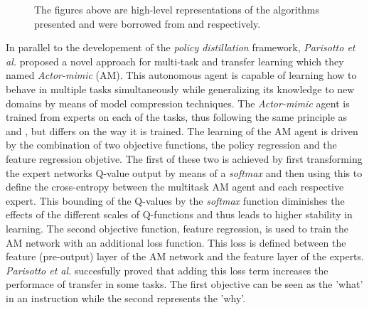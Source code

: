 \documentclass{article}
\begin{document}
\begin{figure}[!ht]
     \hfill
     \caption{The figures above are high-level representations of the algorithms presented and were borrowed from \citep{Teh2017Distral:Learning} and \citep{YinKnowledgeReplay} respectively.}
     \label{fig:high -level}
\end{figure}
\newline
In parallel to the developement of the \textit{policy distillation} framework, \textit{Parisotto et al.} \citep{Parisotto2015Actor-Mimic:Learning} proposed a novel approach for multi-task and transfer learning which they named \textit{Actor-mimic} (AM). This autonomous agent is capable of learning how to behave in multiple tasks simultaneously while generalizing its knowledge to new domains by means of model compression techniques. The \textit{Actor-mimic} agent is trained from experts on each of the tasks, thus following the same principle as \citep{RusuPOLICYDISTILLATION} and \citep{Teh2017Distral:Learning}, but differs on the way it is trained. 
The learning of the AM agent is driven by the combination of two objective functions, the policy regression and the feature regression objetive. The first of these two is achieved by first transforming the expert networks Q-value output by means of a \textit{softmax} and then using this to define the cross-entropy between the multitask AM agent and each respective expert. This bounding of the Q-values by the \textit{softmax} function diminishes the effects of the different scales of Q-functions and thus leads to higher stability in learning. The second objective function, feature regression, is used to train the AM network with an additional loss function. This loss is defined between the feature (pre-output) layer of the AM network and the feature layer of the experts. \textit{Parisotto et al.} succesfully proved that adding this loss term increases the performace of transfer in some tasks. The first objective can be seen as the 'what' in an instruction while the second represents the 'why'.\\ 
\end{document}
